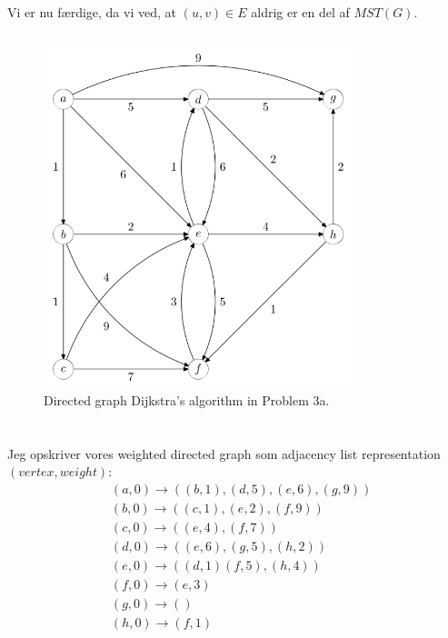 \documentclass[a4paper,12pt]{article}
\begin{document}
Vi er nu færdige, da vi ved, at $(u,v)\in E$ aldrig er en del af $MST(G)$.

\subsection[]{}



\begin{figure}[H]
    \centering
    \includegraphics[width=0.8\textwidth]{3.png}
    \caption{Directed graph Dijkstra's algorithm in Problem 3a.}
\end{figure}
\section[Question 3]{}
\subsection[]{}

Jeg opskriver vores weighted directed graph som adjacency list representation $(vertex, weight)$:
\[
\begin{aligned}
&(a,0) \rightarrow ((b,1), (d,5), (e,6), (g,9))\\
&(b,0) \rightarrow ((c,1), (e,2), (f,9))\\
&(c,0) \rightarrow ((e,4), (f,7))\\
&(d,0) \rightarrow ((e,6), (g,5), (h,2))\\
&(e,0) \rightarrow ((d,1)(f,5), (h,4))\\
&(f,0) \rightarrow (e,3)\\
&(g,0) \rightarrow ()\\
&(h,0) \rightarrow (f,1)\\
\end{aligned}
\]
\end{document}
